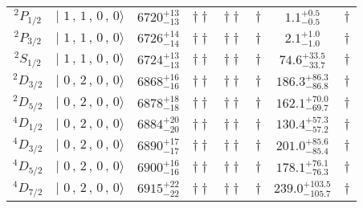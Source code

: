 \begin{tabular}{c| c c c c c c c}
$^{2}P_{1/2}$ & $\vert \,\,1\,,\,1\,,\,0\,,\,0 \rangle $ & $6720^{+13}_{-13}$ & $\dagger\dagger$ & $\dagger\dagger$ & $\dagger$ & $1.1^{+0.5}_{-0.5}$ & $\dagger$ \\ 
$^{2}P_{3/2}$ & $\vert \,\,1\,,\,1\,,\,0\,,\,0 \rangle $ & $6726^{+14}_{-14}$ & $\dagger\dagger$ & $\dagger\dagger$ & $\dagger$ & $2.1^{+1.0}_{-1.0}$ & $\dagger$ \\ 
$^{2}S_{1/2}$ & $\vert \,\,1\,,\,1\,,\,0\,,\,0 \rangle $ & $6724^{+13}_{-13}$ & $\dagger\dagger$ & $\dagger\dagger$ & $\dagger$ & $74.6^{+33.5}_{-33.7}$ & $\dagger$ \\ 
$^{2}D_{3/2}$ & $\vert \,\,0\,,\,2\,,\,0\,,\,0 \rangle $ & $6868^{+16}_{-16}$ & $\dagger\dagger$ & $\dagger\dagger$ & $\dagger$ & $186.3^{+86.3}_{-86.8}$ & $\dagger$ \\ 
$^{2}D_{5/2}$ & $\vert \,\,0\,,\,2\,,\,0\,,\,0 \rangle $ & $6878^{+18}_{-18}$ & $\dagger\dagger$ & $\dagger\dagger$ & $\dagger$ & $162.1^{+70.0}_{-69.7}$ & $\dagger$ \\ 
$^{4}D_{1/2}$ & $\vert \,\,0\,,\,2\,,\,0\,,\,0 \rangle $ & $6884^{+20}_{-20}$ & $\dagger\dagger$ & $\dagger\dagger$ & $\dagger$ & $130.4^{+57.3}_{-57.2}$ & $\dagger$ \\ 
$^{4}D_{3/2}$ & $\vert \,\,0\,,\,2\,,\,0\,,\,0 \rangle $ & $6890^{+17}_{-17}$ & $\dagger\dagger$ & $\dagger\dagger$ & $\dagger$ & $201.0^{+85.6}_{-85.4}$ & $\dagger$ \\ 
$^{4}D_{5/2}$ & $\vert \,\,0\,,\,2\,,\,0\,,\,0 \rangle $ & $6900^{+16}_{-16}$ & $\dagger\dagger$ & $\dagger\dagger$ & $\dagger$ & $178.1^{+76.1}_{-76.3}$ & $\dagger$ \\ 
$^{4}D_{7/2}$ & $\vert \,\,0\,,\,2\,,\,0\,,\,0 \rangle $ & $6915^{+22}_{-22}$ & $\dagger\dagger$ & $\dagger\dagger$ & $\dagger$ & $239.0^{+103.5}_{-105.7}$ & $\dagger$ \\ 
\hline \hline
\end{tabular}
